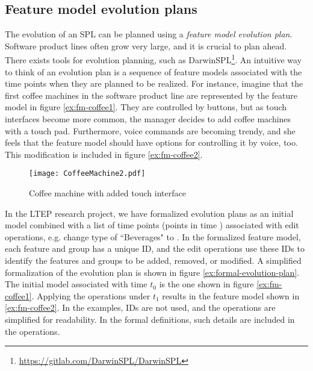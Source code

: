 \subsection{Feature model evolution plans}
\label{sub:feature-model-evolution-plans}
The evolution of an SPL can be planned using a \emph{feature model evolution plan}. Software product lines often grow very large, and it is crucial to plan ahead. There exists tools for evolution planning, such as DarwinSPL\footnote{\url{https://gitlab.com/DarwinSPL/DarwinSPL}}. An intuitive way to think of an evolution plan is a sequence of feature models associated with the time points when they are planned to be realized. For instance, imagine that the first coffee machines in the software product line are represented by the feature model in figure \vref{ex:fm-coffee1}. They are controlled by buttons, but as touch interfaces become more common, the manager decides to add coffee machines with a touch pad. Furthermore, voice commands are becoming trendy, and she feels that the feature model should have options for controlling it by voice, too. This modification is included in figure \vref{ex:fm-coffee2}.

\begin{figure}
   \begin{center}
      \texttt{[image: CoffeeMachine2.pdf]}
   \end{center}
   \caption[Coffee machine with added touch interface]{Coffee machine with added touch interface \footnotemark}
   \label{ex:fm-coffee2}
\end{figure}


In the LTEP research project, we have formalized evolution plans as an initial model combined with a list of time points (points in time ) associated with edit operations, e.g. change type of ``Beverages" to \optional{}. In the formalized feature model, each feature and group has a unique ID, and the edit operations use these IDs to identify the features and groups to be added, removed, or modified. A simplified formalization of the evolution plan is shown in figure \vref{ex:formal-evolution-plan}. The initial model associated with time $t_0$ is the one shown in figure \vref{ex:fm-coffee1}. Applying the operations under $t_1$ results in the feature model shown in \vref{ex:fm-coffee2}. In the examples, IDs are not used, and the operations are simplified for readability. In the formal definitions, such details are included in the operations.

